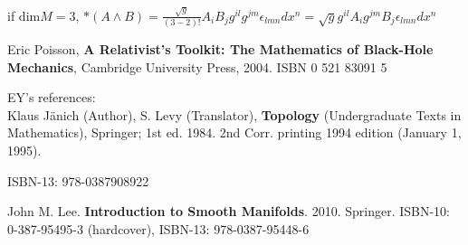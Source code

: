 \documentclass[10pt, twoside]{amsart}
\begin{document}
\begin{multicols*}{2}
if $\text{dim}M = 3$, $*(A\wedge B) = \frac{\sqrt{g}}{(3-2)!} A_i B_j g^{il} g^{jm} \epsilon_{lmn} dx^n = \sqrt{g} g^{il} A_i g^{jm} B_j \epsilon_{lmn}dx^n$

\end{multicols*}

\begin{thebibliography}{9}
Eric Poisson, 
\textbf{A Relativist's Toolkit: The Mathematics of Black-Hole Mechanics},
Cambridge University Press, 
2004.
ISBN 0 521 83091 5

EY's references: \\

Klaus Jänich (Author), S. Levy (Translator), \textbf{Topology} (Undergraduate Texts in Mathematics), Springer; 1st ed. 1984. 2nd Corr. printing 1994 edition (January 1, 1995).

ISBN-13: 978-0387908922

John M. Lee.  \textbf{Introduction to Smooth Manifolds}.  2010. Springer.   ISBN-10: 0-387-95495-3 (hardcover), ISBN-13: 978-0387-95448-6  \\



\end{thebibliography}
\end{document}
